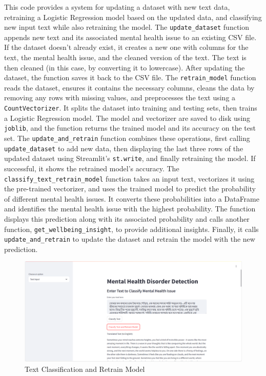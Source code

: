 \noindent
This code provides a system for updating a dataset with new text data, retraining a Logistic Regression model based on the updated data, and classifying new input text while also retraining the model. The \texttt{update\_dataset} function appends new text and its associated mental health issue to an existing CSV file. If the dataset doesn't already exist, it creates a new one with columns for the text, the mental health issue, and the cleaned version of the text. The text is then cleaned (in this case, by converting it to lowercase). After updating the dataset, the function saves it back to the CSV file. The \texttt{retrain\_model} function reads the dataset, ensures it contains the necessary columns, cleans the data by removing any rows with missing values, and preprocesses the text using a \texttt{CountVectorizer}. It splits the dataset into training and testing sets, then trains a Logistic Regression model. The model and vectorizer are saved to disk using \texttt{joblib}, and the function returns the trained model and its accuracy on the test set. The \texttt{update\_and\_retrain} function combines these operations, first calling \texttt{update\_dataset} to add new data, then displaying the last three rows of the updated dataset using Streamlit's \texttt{st.write}, and finally retraining the model. If successful, it shows the retrained model's accuracy. The \texttt{classify\_text\_retrain\_model} function takes an input text, vectorizes it using the pre-trained vectorizer, and uses the trained model to predict the probability of different mental health issues. It converts these probabilities into a DataFrame and identifies the mental health issue with the highest probability. The function displays this prediction along with its associated probability and calls another function, \texttt{get\_wellbeing\_insight}, to provide additional insights. Finally, it calls \texttt{update\_and\_retrain} to update the dataset and retrain the model with the new prediction.

\pagebreak

\begin{figure}[h!]  
    \centering
    \includegraphics[width=1.0\textwidth]{App Images/14 Interface.png}  
    \caption{Text Classification and Retrain Model}
    \label{101i}  %
\end{figure}

